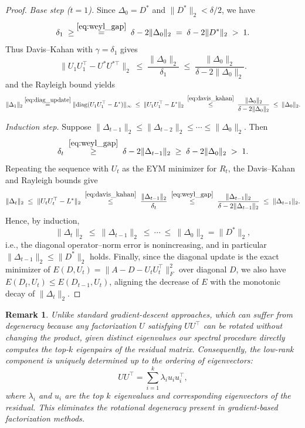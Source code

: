 \documentclass[final,hidelinks,onefignum,onetabnum]{siamart250211}
\providecommand{\diag}{\mathrm{diag}}
\providecommand{\1}{\mathbf{1}}
\newtheorem{rmk}{Remark}[section]
\theoremstyle{plain}
\begin{document}
\begin{proof}
\emph{Base step ($t=1$).} Since $\Delta_0=D^*$ and $\|D^*\|_2<\delta/2$, we have
\[
\delta_1
\;\ge\;
\stackrel{\eqref{eq:weyl_gap}}{=}
\;\delta - 2\|\Delta_0\|_2
\;=\;
\delta - 2\|D^*\|_2
\;>\;
1.
\]
Thus Davis–Kahan with $\gamma=\delta_1$ gives
\begin{equation}
\label{eq:davis_kahan}
\|U_1U_1^\top - U^*U^{*\top}\|_2
\;\le\;
\frac{\|\Delta_0\|_2}{\delta_1}
\;\le\;
\frac{\|\Delta_0\|_2}{\delta - 2\|\Delta_0\|_2}.
\end{equation}
and the Rayleigh bound yields
\[
\|\Delta_1\|_2
\stackrel{\eqref{eq:diag_update}}{=}
\|\diag(U_1U_1^\top - L^*)\|_\infty
\;\le\;
\|U_1U_1^\top - L^*\|_2
\;\stackrel{\eqref{eq:davis_kahan}}{\le}\;
\frac{\|\Delta_0\|_2}{\delta - 2\|\Delta_0\|_2}
\;\le\;
\|\Delta_0\|_2.
\]

\emph{Induction step.} Suppose $\|\Delta_{t-1}\|_2\le\|\Delta_{t-2}\|_2\le\cdots\le\|\Delta_0\|_2$.
Then
\[
\delta_t
\;\stackrel{\eqref{eq:weyl_gap}}{\ge}\;
\delta - 2\|\Delta_{t-1}\|_2
\;\ge\;
\delta - 2\|\Delta_0\|_2
\;>\;
1.
\]
Repeating the sequence with \(U_t\) as the EYM minimizer for \(R_t\), 
the Davis–Kahan and Rayleigh bounds give
\[
\|\Delta_t\|_2
\;\le\;
\|U_tU_t^\top - L^*\|_2
\;\stackrel{\eqref{eq:davis_kahan}}{\le}\;
\frac{\|\Delta_{t-1}\|_2}{\delta_t}
\;\stackrel{\eqref{eq:weyl_gap}}{\le}\;
\frac{\|\Delta_{t-1}\|_2}{\delta - 2\|\Delta_{t-1}\|_2}
\;\le\;
\|\Delta_{t-1}\|_2.
\]
Hence, by induction,
\[
\|\Delta_t\|_2\ \le\ \|\Delta_{t-1}\|_2\ \le\ \cdots\ \le\ \|\Delta_0\|_2=\|D^*\|_2,
\]
i.e., the diagonal operator–norm error is nonincreasing, and in particular $\|\Delta_{t-1}\|_2\le\|D^*\|_2$ holds.
Finally, since the diagonal update is the exact minimizer of
\(E(D,U_t)=\|A-D-U_tU_t^\top\|_F^2\) over diagonal \(D\), we also have
\(E(D_t,U_t)\le E(D_{t-1},U_t)\), aligning the decrease of \(E\) with the monotonic decay of \(\|\Delta_t\|_2\).
\end{proof}


\begin{rmk}
      Unlike standard gradient-descent approaches, which can suffer from degeneracy because any factorization $U$ satisfying $U U^\top$ can be rotated without changing the product, given distinct eigenvalues our spectral procedure directly computes the top-$k$ eigenpairs of the residual matrix. Consequently, the low-rank component is uniquely determined up to the ordering of eigenvectors:
\[
U U^\top = \sum_{i=1}^k \lambda_i u_i u_i^\top,
\]
where $\lambda_i$ and $u_i$ are the top $k$ eigenvalues and corresponding eigenvectors of the residual. This eliminates the rotational degeneracy present in gradient-based factorization methods.   
\end{rmk}
\end{document}
